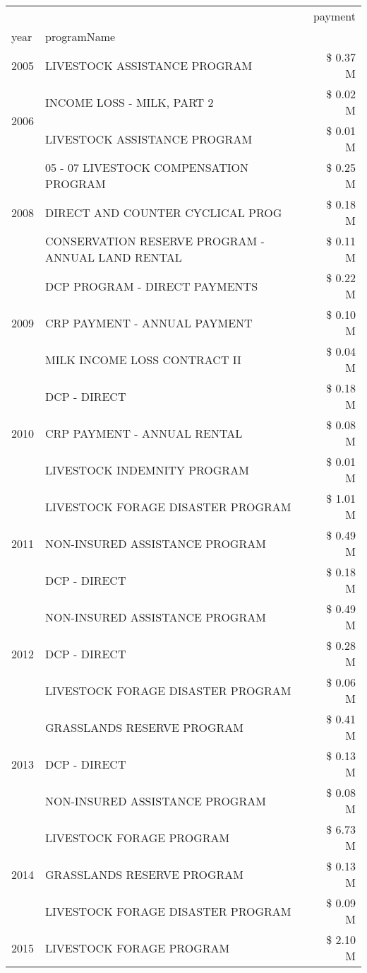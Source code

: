 \begin{tabular}{llr}
\toprule
 &  & payment \\
year & programName &  \\
\midrule
2005 & LIVESTOCK ASSISTANCE PROGRAM & \$ 0.37 M \\
\cline{1-3}
\multirow[t]{2}{*}{2006} & INCOME LOSS - MILK, PART 2 & \$ 0.02 M \\
 & LIVESTOCK ASSISTANCE PROGRAM & \$ 0.01 M \\
\cline{1-3}
\multirow[t]{3}{*}{2008} & 05 - 07 LIVESTOCK COMPENSATION PROGRAM & \$ 0.25 M \\
 & DIRECT AND COUNTER CYCLICAL PROG & \$ 0.18 M \\
 & CONSERVATION RESERVE PROGRAM - ANNUAL LAND RENTAL & \$ 0.11 M \\
\cline{1-3}
\multirow[t]{3}{*}{2009} & DCP PROGRAM - DIRECT PAYMENTS & \$ 0.22 M \\
 & CRP PAYMENT - ANNUAL PAYMENT & \$ 0.10 M \\
 & MILK INCOME LOSS CONTRACT II & \$ 0.04 M \\
\cline{1-3}
\multirow[t]{3}{*}{2010} & DCP - DIRECT & \$ 0.18 M \\
 & CRP PAYMENT - ANNUAL RENTAL & \$ 0.08 M \\
 & LIVESTOCK INDEMNITY PROGRAM & \$ 0.01 M \\
\cline{1-3}
\multirow[t]{3}{*}{2011} & LIVESTOCK FORAGE DISASTER PROGRAM & \$ 1.01 M \\
 & NON-INSURED ASSISTANCE PROGRAM & \$ 0.49 M \\
 & DCP - DIRECT & \$ 0.18 M \\
\cline{1-3}
\multirow[t]{3}{*}{2012} & NON-INSURED ASSISTANCE PROGRAM & \$ 0.49 M \\
 & DCP - DIRECT & \$ 0.28 M \\
 & LIVESTOCK FORAGE DISASTER PROGRAM & \$ 0.06 M \\
\cline{1-3}
\multirow[t]{3}{*}{2013} & GRASSLANDS RESERVE PROGRAM & \$ 0.41 M \\
 & DCP - DIRECT & \$ 0.13 M \\
 & NON-INSURED ASSISTANCE PROGRAM & \$ 0.08 M \\
\cline{1-3}
\multirow[t]{3}{*}{2014} & LIVESTOCK FORAGE PROGRAM & \$ 6.73 M \\
 & GRASSLANDS RESERVE PROGRAM & \$ 0.13 M \\
 & LIVESTOCK FORAGE DISASTER PROGRAM & \$ 0.09 M \\
\cline{1-3}
\multirow[t]{3}{*}{2015} & LIVESTOCK FORAGE PROGRAM & \$ 2.10 M \\

\end{tabular}
